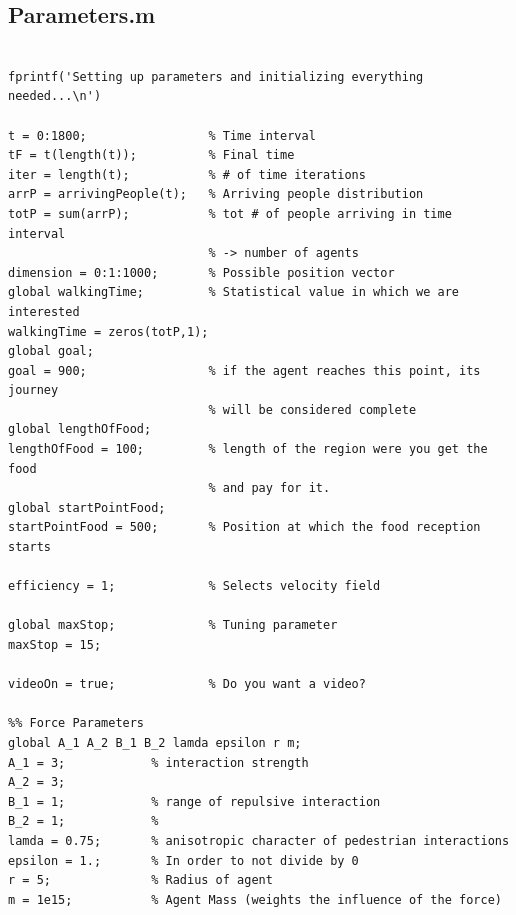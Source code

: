 \documentclass[11pt]{article}
\begin{document}
\subsection*{Parameters.m}
\begin{lstlisting}[frame=lines]
%% Parameters

fprintf('Setting up parameters and initializing everything needed...\n')

t = 0:1800;                 % Time interval
tF = t(length(t));          % Final time
iter = length(t);           % # of time iterations
arrP = arrivingPeople(t);   % Arriving people distribution
totP = sum(arrP);           % tot # of people arriving in time interval
                            % -> number of agents
dimension = 0:1:1000;       % Possible position vector
global walkingTime;         % Statistical value in which we are interested
walkingTime = zeros(totP,1);
global goal;
goal = 900;                 % if the agent reaches this point, its journey 
                            % will be considered complete
global lengthOfFood;        
lengthOfFood = 100;         % length of the region were you get the food
                            % and pay for it.
global startPointFood;
startPointFood = 500;       % Position at which the food reception starts

efficiency = 1;             % Selects velocity field

global maxStop;             % Tuning parameter
maxStop = 15;

videoOn = true;             % Do you want a video?

%% Force Parameters
global A_1 A_2 B_1 B_2 lamda epsilon r m;
A_1 = 3;            % interaction strength
A_2 = 3; 
B_1 = 1;            % range of repulsive interaction
B_2 = 1;            %
lamda = 0.75;       % anisotropic character of pedestrian interactions
epsilon = 1.;       % In order to not divide by 0 
r = 5;              % Radius of agent
m = 1e15;           % Agent Mass (weights the influence of the force)
\end{lstlisting}
\end{document}
